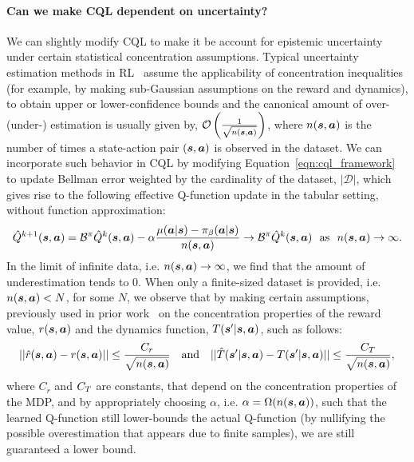 \paragraph{Can we make CQL dependent on uncertainty?} We can slightly modify CQL to make it be account for epistemic uncertainty under certain statistical concentration assumptions. Typical uncertainty estimation methods in RL~\citep{osband2016deep,jaksch2010near} assume the applicability of concentration inequalities (for example, by making sub-Gaussian assumptions on the reward and dynamics), to obtain upper or lower-confidence bounds and the canonical amount of over- (under-) estimation is usually given by,  $\mathcal{O}\left(\frac{1}{\sqrt{n(\boldsymbol{s}, \boldsymbol{a})}}\right)$, where $n(\boldsymbol{s}, \boldsymbol{a})$ is the number of times a state-action pair $(\boldsymbol{s}, \boldsymbol{a})$ is observed in the dataset. We can incorporate such behavior in CQL by modifying Equation~\ref{eqn:cql_framework} to update Bellman error weighted by the cardinality of the dataset, $|\mathcal{D}|$, which gives rise to the following effective Q-function update in the tabular setting, without function approximation:
\begin{equation*}
    \hat{Q}^{k+1}(\boldsymbol{s}, \boldsymbol{a}) = \mathcal{B}^\pi \hat{Q}^k(\boldsymbol{s}, \boldsymbol{a}) - \alpha \frac{\mu(\boldsymbol{a}|\boldsymbol{s}) - {\pi_\beta}(\boldsymbol{a}|\boldsymbol{s})}{n(\boldsymbol{s},\boldsymbol{a})} \rightarrow \mathcal{B}^\pi \hat{Q}^k(\boldsymbol{s}, \boldsymbol{a}) \text{~~as~~} n(\boldsymbol{s}, \boldsymbol{a}) \rightarrow \infty.
\end{equation*}
In the limit of infinite data, i.e. $n(\boldsymbol{s}, \boldsymbol{a}) \rightarrow \infty$, we find that the amount of underestimation tends to $0$. When only a finite-sized dataset is provided, i.e. $n(\boldsymbol{s}, \boldsymbol{a}) < N$, for some $N$, we observe that by making certain assumptions, previously used in prior work~\citep{jaksch2010near,osband2016deep} on the concentration properties of the reward value, $r(\boldsymbol{s}, \boldsymbol{a})$ and the dynamics function, $T(\boldsymbol{s}'|\boldsymbol{s}, \boldsymbol{a})$, such as follows:
\begin{equation*}
    ||\hat{r}(\boldsymbol{s}, \boldsymbol{a}) - r(\boldsymbol{s}, \boldsymbol{a})|| \leq \frac{C_r}{\sqrt{n(\boldsymbol{s}, \boldsymbol{a})}} ~~~ \text{and} ~~~ ||\hat{T}(\boldsymbol{s}'|\boldsymbol{s}, \boldsymbol{a}) - T(\boldsymbol{s}'|\boldsymbol{s}, \boldsymbol{a})|| \leq \frac{C_T}{\sqrt{n(\boldsymbol{s}, \boldsymbol{a})}}, 
\end{equation*}
where $C_r$ and $C_T$ are constants, that depend on the concentration properties of the MDP, and by appropriately choosing $\alpha$, i.e. $\alpha = \Omega (n(\boldsymbol{s}, \boldsymbol{a}))$, such that the learned Q-function still lower-bounds the actual Q-function (by nullifying the possible overestimation that appears due to finite samples), we are still guaranteed a lower bound. 


